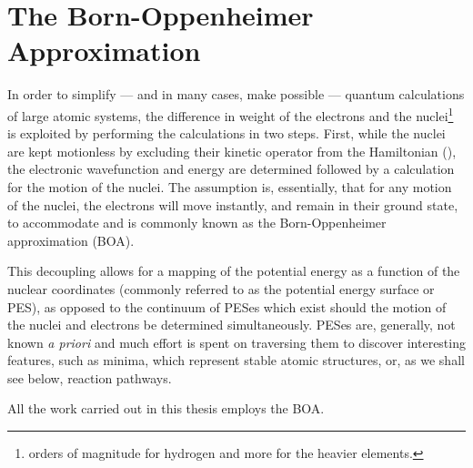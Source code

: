 \section{The Born-Oppenheimer Approximation}
\label{sec:born-oppenheimer}

In order to simplify --- and in many cases, make possible --- quantum calculations of large atomic systems, the difference in weight of the electrons and the nuclei\footnote{ orders of magnitude for hydrogen and more for the heavier elements.} is exploited by performing the calculations in two steps.
First, while the nuclei are kept motionless by excluding their kinetic operator from the Hamiltonian (), the electronic wavefunction and energy are determined followed by a calculation for the motion of the nuclei.
The assumption is, essentially, that for any motion of the nuclei, the electrons will move instantly, and remain in their ground state, to accommodate and is commonly known as the Born-Oppenheimer approximation\cite{born-oppenheimer-1927} (BOA).


This decoupling allows for a mapping of the potential energy as a function of the nuclear coordinates (commonly referred to as the potential energy surface or PES), as opposed to the continuum of PESes which exist should the motion of the nuclei and electrons be determined simultaneously.
PESes are, generally, not known \textit{a priori} and much effort is spent on traversing them to discover interesting features, such as minima, which represent stable atomic structures, or, as we shall see below, reaction pathways.



All the work carried out in this thesis employs the BOA.
